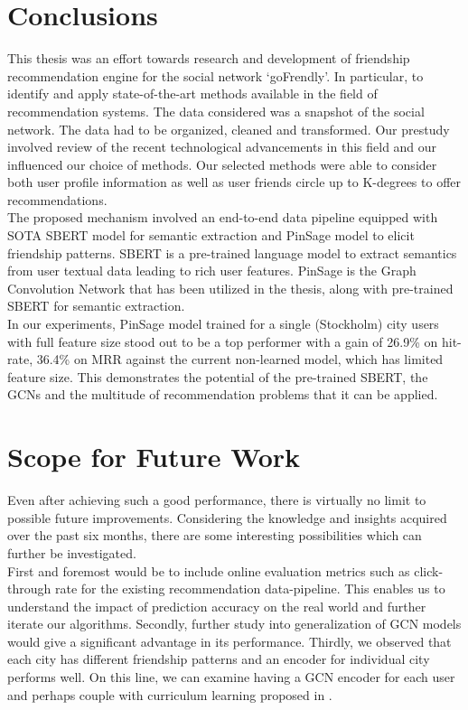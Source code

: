 \documentclass{kththesis}
\begin{document}
\section{Conclusions}
This thesis was an effort towards research and development of friendship recommendation engine for the social network `goFrendly'. In particular, to identify and apply state-of-the-art methods available in the field of recommendation systems. The data considered was a snapshot of the social network. The data had to be organized, cleaned and transformed. Our prestudy involved review of the recent technological advancements in this field and our influenced our choice of methods. Our selected methods were able to consider both user profile information as well as user friends circle up to K-degrees to offer recommendations. \\

The proposed mechanism involved an end-to-end data pipeline equipped with SOTA SBERT model for semantic extraction and PinSage model to elicit friendship patterns. SBERT is a pre-trained language model to extract semantics from user textual data leading to rich user features. PinSage is the Graph Convolution Network that has been utilized in the thesis, along with pre-trained SBERT for semantic extraction. \\

In our experiments, PinSage model trained for a single (Stockholm) city users with full feature size stood out to be a top performer with a gain of 26.9\% on hit-rate, 36.4\% on MRR against the current non-learned model, which has limited feature size. This demonstrates the potential of the pre-trained SBERT, the GCNs and the multitude of recommendation problems that it can be applied.

\section{Scope for Future Work}
Even after achieving such a good performance, there is virtually no limit to possible future improvements. Considering the knowledge and insights acquired over the past six months, there are some interesting possibilities which can further be investigated. \\

First and foremost would be to include online evaluation metrics such as click-through rate for the existing recommendation data-pipeline. This enables us to understand the impact of prediction accuracy on the real world and further iterate our algorithms. Secondly, further study into generalization of GCN models would give a significant advantage in its performance. Thirdly, we observed that each city has different friendship patterns and an encoder for individual city performs well. On this line, we can examine having a GCN encoder for each user and perhaps couple with curriculum learning proposed in \cite{PinSage}. \\
\end{document}
